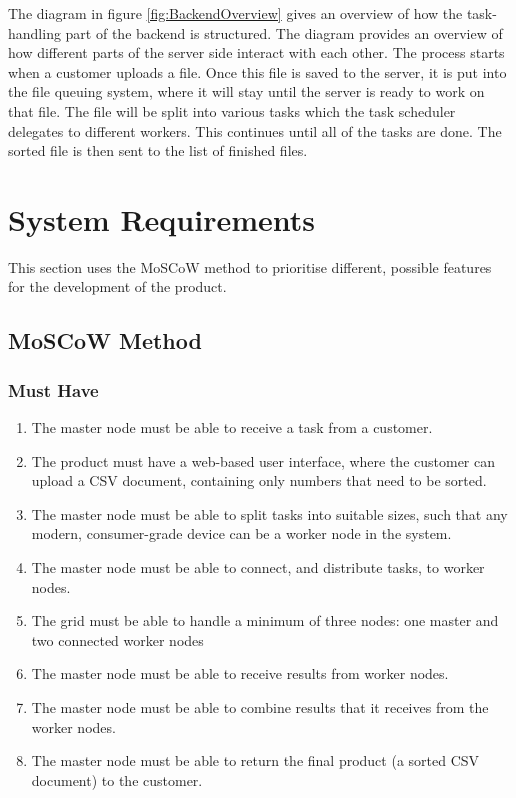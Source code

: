 The diagram in figure \ref{fig:BackendOverview} gives an overview of how the task-handling part of the backend is structured. The diagram provides an overview of how different parts of the server side interact with each other. The process starts when a customer uploads a file. Once this file is saved to the server, it is put into the file queuing system, where it will stay until the server is ready to work on that file. The file will be split into various tasks which the task scheduler delegates to different workers. This continues until all of the tasks are done. The sorted file is then sent to the list of finished files.

\section{System Requirements} \label{sec:MoSCoW}
This section uses the MoSCoW method to prioritise different, possible features for the development of the product. 

\subsection{MoSCoW Method} 

\subsubsection{Must Have} 
\begin{enumerate}
    \item The master node must be able to receive a task from a customer.
    \item The product must have a web-based user interface, where the customer can upload a CSV document, containing only numbers that need to be sorted.
    \item The master node must be able to split tasks into suitable sizes, such that any modern, consumer-grade device can be a worker node in the system.
    \item The master node must be able to connect, and distribute tasks, to worker nodes.
    \item The grid must be able to handle a minimum of three nodes: one master and two connected worker nodes
    \item The master node must be able to receive results from worker nodes.
    \item The master node must be able to combine results that it receives from the worker nodes.
    \item The master node must be able to return the final product (a sorted CSV document) to the customer.
\end{enumerate}

